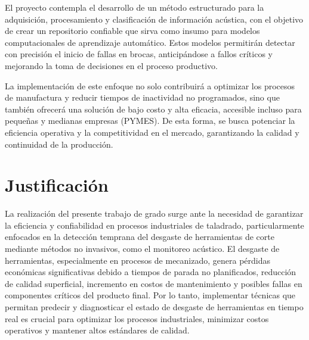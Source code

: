 \documentclass[12pt, letterpaper]{report}
\begin{document}
El proyecto contempla el desarrollo de un método estructurado para la adquisición, procesamiento y clasificación de información acústica, con el objetivo de crear un repositorio confiable que sirva como insumo para modelos computacionales de aprendizaje automático. Estos modelos permitirán detectar con precisión el inicio de fallas en brocas, anticipándose a fallos críticos y mejorando la toma de decisiones en el proceso productivo.

La implementación de este enfoque no solo contribuirá a optimizar los procesos de manufactura y reducir tiempos de inactividad no programados, sino que también ofrecerá una solución de bajo costo y alta eficacia, accesible incluso para pequeñas y medianas empresas (PYMES). De esta forma, se busca potenciar la eficiencia operativa y la competitividad en el mercado, garantizando la calidad y continuidad de la producción.

\section{Justificación}

La realización del presente trabajo de grado surge ante la necesidad de garantizar la eficiencia y confiabilidad en procesos industriales de taladrado, particularmente enfocados en la detección temprana del desgaste de herramientas de corte mediante métodos no invasivos, como el monitoreo acústico. El desgaste de herramientas, especialmente en procesos de mecanizado, genera pérdidas económicas significativas debido a tiempos de parada no planificados, reducción de calidad superficial, incremento en costos de mantenimiento y posibles fallas en componentes críticos del producto final. Por lo tanto, implementar técnicas que permitan predecir y diagnosticar el estado de desgaste de herramientas en tiempo real es crucial para optimizar los procesos industriales, minimizar costos operativos y mantener altos estándares de calidad.
\end{document}
